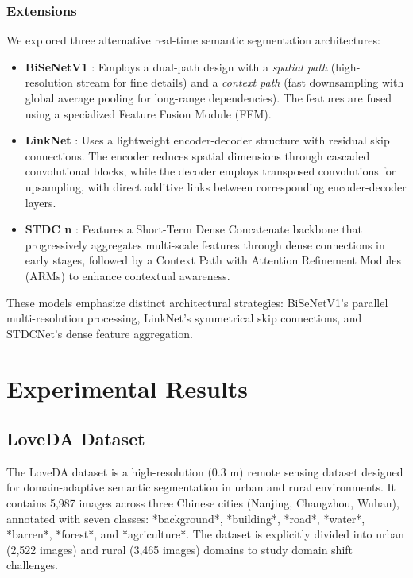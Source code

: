 \documentclass{article}
\begin{document}
\begin{multicols}{2}
		\subsubsection{Extensions}
		We explored three alternative real-time semantic segmentation architectures:
		\begin{itemize}
			\item \textbf{BiSeNetV1} \cite{yu2018bisenet}: Employs a dual-path design with a \textit{spatial path} (high-resolution stream for fine details) and a \textit{context path} (fast downsampling with global average pooling for long-range dependencies). The features are fused using a specialized Feature Fusion Module (FFM).
			\item \textbf{LinkNet} \cite{chaurasia2017linknet}: Uses a lightweight encoder-decoder structure with residual skip connections. The encoder reduces spatial dimensions through cascaded convolutional blocks, while the decoder employs transposed convolutions for upsampling, with direct additive links between corresponding encoder-decoder layers.
			\item \textbf{STDC n} \cite{fan2021rethinking}: Features a Short-Term Dense Concatenate backbone that progressively aggregates multi-scale features through dense connections in early stages, followed by a Context Path with Attention Refinement Modules (ARMs) to enhance contextual awareness.
		\end{itemize}
		These models emphasize distinct architectural strategies: BiSeNetV1's parallel multi-resolution processing, LinkNet's symmetrical skip connections, and STDCNet's dense feature aggregation.
		
		
		
		\section{Experimental Results}
		\subsection{LoveDA Dataset}  
		The LoveDA dataset \cite{loveda2021} is a high-resolution (0.3 m) remote sensing dataset designed for domain-adaptive semantic segmentation in urban and rural environments. It contains 5,987 images across three Chinese cities (Nanjing, Changzhou, Wuhan), annotated with seven classes: *background*, *building*, *road*, *water*, *barren*, *forest*, and *agriculture*. The dataset is explicitly divided into urban (2,522 images) and rural (3,465 images) domains to study domain shift challenges.  
		

\end{multicols}
\end{document}
